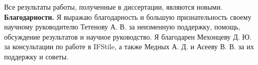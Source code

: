 Все результаты работы, полученные в диссертации, являются новыми.
\\

\textbf{Благодарности.}
Я выражаю благодарность и большую признательность своему научному руководителю Тетенову А. В. за неизменную поддержку, помощь, обсуждение результатов и научное руководство.
Я благодарен Мехонцеву Д. Ю.  за консультации по работе в IFStile, а также Медных А. Д. и Асееву В. В. за их поддержку и советы.